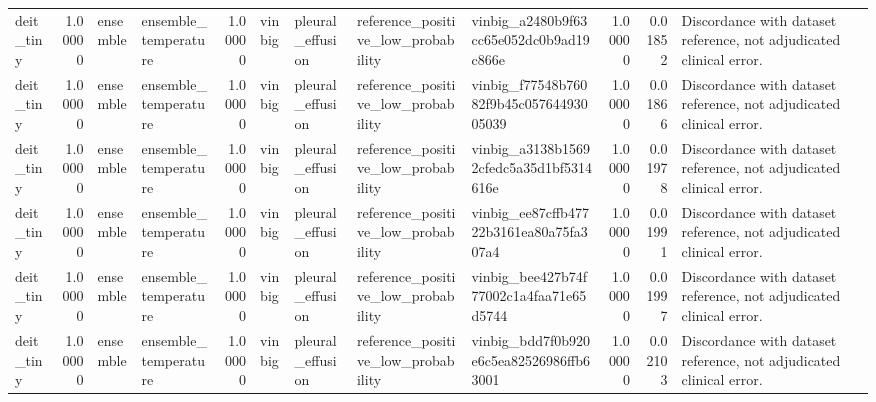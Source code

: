 \begin{tabular}{lrllrllllrrl}
deit\_tiny & 1.00000 & ensemble & ensemble\_temperature & 1.00000 & vinbig & pleural\_effusion & reference\_positive\_low\_probability & vinbig\_a2480b9f63cc65e052dc0b9ad19c866e & 1.00000 & 0.01852 & Discordance with dataset reference, not adjudicated clinical error. \\
deit\_tiny & 1.00000 & ensemble & ensemble\_temperature & 1.00000 & vinbig & pleural\_effusion & reference\_positive\_low\_probability & vinbig\_f77548b76082f9b45c05764493005039 & 1.00000 & 0.01866 & Discordance with dataset reference, not adjudicated clinical error. \\
deit\_tiny & 1.00000 & ensemble & ensemble\_temperature & 1.00000 & vinbig & pleural\_effusion & reference\_positive\_low\_probability & vinbig\_a3138b15692cfedc5a35d1bf5314616e & 1.00000 & 0.01978 & Discordance with dataset reference, not adjudicated clinical error. \\
deit\_tiny & 1.00000 & ensemble & ensemble\_temperature & 1.00000 & vinbig & pleural\_effusion & reference\_positive\_low\_probability & vinbig\_ee87cffb47722b3161ea80a75fa307a4 & 1.00000 & 0.01991 & Discordance with dataset reference, not adjudicated clinical error. \\
deit\_tiny & 1.00000 & ensemble & ensemble\_temperature & 1.00000 & vinbig & pleural\_effusion & reference\_positive\_low\_probability & vinbig\_bee427b74f77002c1a4faa71e65d5744 & 1.00000 & 0.01997 & Discordance with dataset reference, not adjudicated clinical error. \\
deit\_tiny & 1.00000 & ensemble & ensemble\_temperature & 1.00000 & vinbig & pleural\_effusion & reference\_positive\_low\_probability & vinbig\_bdd7f0b920e6c5ea82526986ffb63001 & 1.00000 & 0.02103 & Discordance with dataset reference, not adjudicated clinical error. \\
\bottomrule
\end{tabular}

